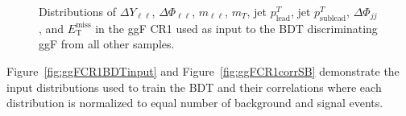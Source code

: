 \begin{figure}[!h]
{  }\hfill
  \hfill
{\caption{Distributions of $\Delta Y_{\ell\ell}$, $\Delta \Phi_{\ell\ell}$, $m_{\ell\ell}$, $m_T$, jet $p^T_{\text{lead}}$, jet $p^T_{\text{sublead}}$, $\Delta \Phi_{jj}$, and $\ensuremath{E_{\text{T}}^{\text{miss}}}$ in the ggF CR1 used as input to the BDT discriminating ggF from all other samples.
\label{fig:ggFCR1}}}
\end{figure} 

Figure~\ref{fig:ggFCR1BDTinput} and Figure~\ref{fig:ggFCR1corrSB} demonstrate the input distributions used to train the BDT and their correlations where each distribution is normalized to equal number of background and signal events. 


